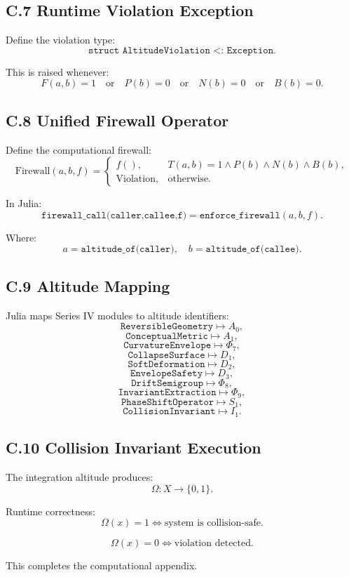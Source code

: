 \subsection*{C.7 Runtime Violation Exception}

Define the violation type:
\[
\texttt{struct AltitudeViolation <: Exception}.
\]

This is raised whenever:
\[
F(a,b)=1 \quad \text{or} \quad P(b)=0 \quad \text{or} \quad N(b)=0 \quad \text{or} \quad B(b)=0.
\]

\subsection*{C.8 Unified Firewall Operator}

Define the computational firewall:
\[
\mathrm{Firewall}(a,b,f) =
\begin{cases}
f(), & T(a,b)=1 \land P(b) \land N(b) \land B(b), \\
\mathrm{Violation}, & \text{otherwise}.
\end{cases}
\]

In Julia:
\[
\texttt{firewall\_call(caller,callee,f)} =
\texttt{enforce\_firewall}(a,b,f).
\]

Where:
\[
a = \texttt{altitude\_of(caller)},\quad
b = \texttt{altitude\_of(callee)}.
\]

\subsection*{C.9 Altitude Mapping}

Julia maps Series IV modules to altitude identifiers:
\[
\texttt{ReversibleGeometry} \mapsto A_0,
\]
\[
\texttt{ConceptualMetric} \mapsto A_1,
\]
\[
\texttt{CurvatureEnvelope} \mapsto \Phi_7,
\]
\[
\texttt{CollapseSurface} \mapsto D_1,
\]
\[
\texttt{SoftDeformation} \mapsto D_2,
\]
\[
\texttt{EnvelopeSafety} \mapsto D_3,
\]
\[
\texttt{DriftSemigroup} \mapsto \Phi_8,
\]
\[
\texttt{InvariantExtraction} \mapsto \Phi_9,
\]
\[
\texttt{PhaseShiftOperator} \mapsto S_1,
\]
\[
\texttt{CollisionInvariant} \mapsto I_1.
\]

\subsection*{C.10 Collision Invariant Execution}

The integration altitude produces:
\[
\Omega : X \to \{0,1\}.
\]

Runtime correctness:
\[
\Omega(x)=1 \iff \text{system is collision-safe}.
\]

\[
\Omega(x)=0 \iff \text{violation detected}.
\]

This completes the computational appendix.
